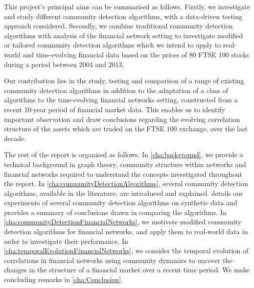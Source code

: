 This project's principal aims can be summarised as follows.
Firstly, we investigate and study different community detection algorithms, with a data-driven testing approach considered.
Secondly, we combine traditional community detection algorithms with analysis of the financial network setting to investigate modified or tailored community detection algorithms which we intend to apply to real-world and time-evolving financial data based on the prices of 80 FTSE 100 stocks during a period between 2004 and 2013.

Our contribution lies in the study, testing and comparison of a range of existing community detection algorithms in addition to the adaptation of a class of algorithms to the time-evolving financial networks setting, constructed from a recent 10-year period of financial market data.
This enables us to identify important observation and draw conclusions regarding the evolving correlation structure of the assets which are traded on the FTSE 100 exchange, over the last decade.

The rest of the report is organised as follows.
In \cref{cha:background}, we provide a technical background in graph theory, community structure within networks and financial networks required to understand the concepts investigated throughout the report.
In \cref{cha:communityDetectionAlgorithms}, several community detection algorithms, available in the literature, are introduced and explained.
 details our experiments of several community detection algorithms on synthetic data and provides a summary of conclusions drawn in comparing the algorithms.
In \cref{cha:communityDetectionFinancialNetworks}, we motivate modified community detection algorithms for financial networks, and apply them to real-world data in order to investigate their performance.
In \cref{cha:temporalEvolutionFinancialNetworks}, we consider the temporal evolution of correlations in financial networks using community dynamics to uncover the changes in the structure of a financial market over a recent time period.
We make concluding remarks in \cref{cha:Conclusion}.